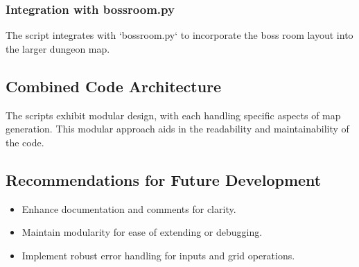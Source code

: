 \documentclass[10pt,twocolumn]{article}
\begin{document}
\subsubsection{Integration with bossroom.py}
The script integrates with `bossroom.py` to incorporate the boss room layout into the larger dungeon map.

\subsection{Combined Code Architecture}
The scripts exhibit modular design, with each handling specific aspects of map generation. This modular approach aids in the readability and maintainability of the code.

\subsection{Recommendations for Future Development}
\begin{itemize}
    \item Enhance documentation and comments for clarity.
    \item Maintain modularity for ease of extending or debugging.
    \item Implement robust error handling for inputs and grid operations.
\end{itemize}


\printbibliography
\end{document}
